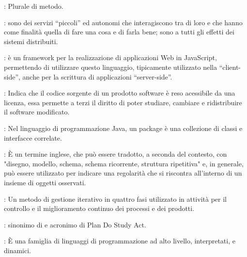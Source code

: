 {		%
		: Plurale di metodo.

		: sono dei servizi “piccoli” ed autonomi che interagiscono tra di loro e che hanno come finalità quella di fare una cosa e di farla bene; sono a tutti gli effetti dei sistemi distribuiti.

		: è un framework per la realizzazione di applicazioni Web in JavaScript, permettendo di utilizzare questo linguaggio, tipicamente utilizzato nella “client-side”, anche per la scrittura di applicazioni “server-side”.

		: Indica che il codice sorgente di un prodotto software è reso acessibile da una licenza, essa permette a terzi il diritto di poter studiare, cambiare e ridistribuire il software modificato.


		: Nel linguaggio di programmazione Java, un package è una collezione di classi e interfacce correlate.

		: È un termine inglese, che può essere tradotto, a seconda del contesto, con "disegno, modello, schema, schema ricorrente, struttura ripetitiva" e, in generale, può essere utilizzato per indicare una regolarità che si riscontra all'interno di un insieme di oggetti osservati.

		: Un metodo di gestione iterativo in quattro fasi utilizzato in attività per il controllo e il miglioramento continuo dei processi e dei prodotti.

		: sinonimo di  e acronimo di Plan Do Study Act.

		: È una famiglia di linguaggi di programmazione ad alto livello, interpretati, e dinamici.

}
